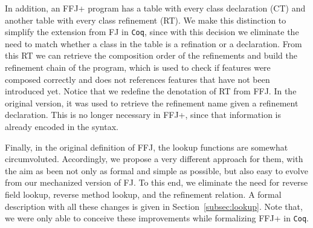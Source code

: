In addition, an \ac{FFJ+} program has a table with every class 
declaration (\textsf{CT}) and another table with every class refinement (\textsf{RT}).
We make this distinction to simplify the extension from \ac{FJ} in \texttt{Coq}, since 
with this decision we eliminate the need to match whether a class in the table 
is a refination or a declaration. From this \textsf{RT} we can retrieve the composition order
of the refinements and build the refinement chain of the program, 
which is used to check if features were composed correctly and
does not references features that have not been introduced yet. 
Notice that we redefine the denotation of \textsf{RT} from \ac{FFJ}.
In the original version, it was used to retrieve the refinement name given a 
refinement declaration. This is no longer necessary in \ac{FFJ+}, since
that information is already encoded in the syntax.

Finally, in the original definition of \ac{FFJ}, the lookup functions are 
somewhat circumvoluted. Accordingly, we propose a very different approach
for them, with the aim as been not only as formal and simple as possible, 
but also easy to evolve from our mechanized version of \ac{FJ}. 
To this end, we eliminate the need for reverse field lookup, reverse method lookup, 
and the refinement relation. A formal description with all these changes 
is given in Section~\ref{subsec:lookup}. Note that, we were only 
able to conceive these improvements while formalizing \ac{FFJ+} in 
\texttt{Coq}. 


